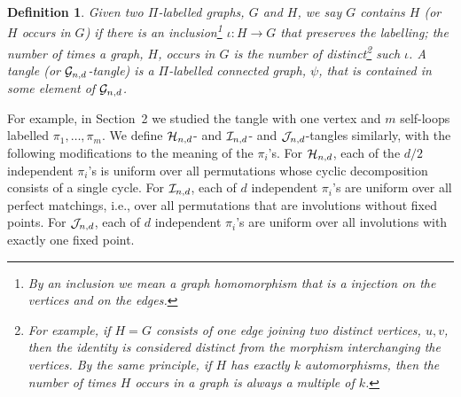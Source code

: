 \documentclass[12pt]{article}
\newtheorem{definition}[theorem]{Definition}
\newcommand{\from}{\colon}
\newcommand{\cg}{{\cal G}}
\newcommand{\ch}{{\cal H}}
\newcommand{\ci}{{\cal I}}
\newcommand{\cj}{{\cal J}}
\newcommand{\cjnd}{\cj_{n,d}}
\newcommand{\cind}{\ci_{n,d}}
\newcommand{\cgnd}{\cg_{n,d}}
\newcommand{\chnd}{\ch_{n,d}}
\newcommand{\tang}{{\psi}}	%
\begin{document}
\begin{definition} 
Given two $\Pi$-labelled graphs, $G$ and $H$, we say $G$ {\em contains}
$H$ (or $H$ occurs in $G$) if there is an
inclusion\footnote{By an inclusion we mean a graph homomorphism that is
a injection on the vertices and on 
the edges.} $\iota\from H\to G$ that preserves
the labelling;
the {\em number of times} a graph, $H$, {\em occurs} in $G$ is
the number of distinct\footnote{
	For example, if $H=G$ consists of one edge joining two distinct
	vertices, $u,v$, then the identity is considered distinct from
	the morphism interchanging the vertices.  By the same principle,
	if $H$ has exactly $k$ automorphisms, then the number of times
	$H$ occurs in a graph is always a multiple of $k$.
} such $\iota$.
A {\em tangle} (or {\em $\cgnd$-tangle}) is a $\Pi$-labelled
connected graph, $\tang$, that is contained in some element of $\cgnd$.
\end{definition}
For example, in Section~2 we studied the
tangle with one vertex and $m$ self-loops labelled $\pi_1,\ldots,\pi_m$.
We define $\chnd$- and $\cind$- and $\cjnd$-tangles similarly, with
the following modifications to the meaning of the $\pi_i$'s.  For
$\chnd$, each of the $d/2$ independent $\pi_i$'s is uniform over all
permutations whose cyclic decomposition consists of a single cycle.
For $\cind$, each of $d$ independent $\pi_i$'s are uniform over all
perfect matchings, i.e., over all permutations that are involutions
without fixed points.
For $\cjnd$, each of $d$ independent $\pi_i$'s are uniform over all
involutions with exactly one fixed point.
\end{document}
